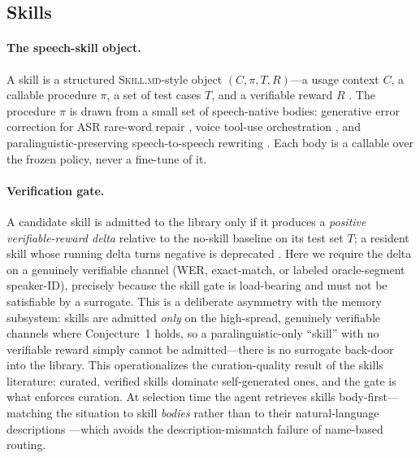 \subsection{Skills}
\label{subsec:skills}

\paragraph{The speech-skill object.} A skill is a structured \textsc{Skill.md}-style object $(C, \pi, T, R)$---a usage context $C$, a callable procedure $\pi$, a set of test cases $T$, and a verifiable reward $R$ \citep{sokskills2026,anthropicskills}. The procedure $\pi$ is drawn from a small set of speech-native bodies: generative error correction for ASR rare-word repair \citep{gerrarewords2025}, voice tool-use orchestration \citep{aura2025}, and paralinguistic-preserving speech-to-speech rewriting \citep{paras2s2025}. Each body is a callable over the frozen policy, never a fine-tune of it.

\paragraph{Verification gate.} A candidate skill is admitted to the library only if it produces a \emph{positive verifiable-reward delta} relative to the no-skill baseline on its test set $T$; a resident skill whose running delta turns negative is deprecated \citep{skillsbench2026}. Here we require the delta on a genuinely verifiable channel (WER, exact-match, or labeled oracle-segment speaker-ID), precisely because the skill gate is load-bearing and must not be satisfiable by a surrogate. This is a deliberate asymmetry with the memory subsystem: skills are admitted \emph{only} on the high-spread, genuinely verifiable channels where Conjecture~1 holds, so a paralinguistic-only ``skill'' with no verifiable reward simply cannot be admitted---there is no surrogate back-door into the library. This operationalizes the curation-quality result of the skills literature: curated, verified skills dominate self-generated ones, and the gate is what enforces curation. At selection time the agent retrieves skills body-first---matching the situation to skill \emph{bodies} rather than to their natural-language descriptions \citep{skillrouter2026}---which avoids the description-mismatch failure of name-based routing.

